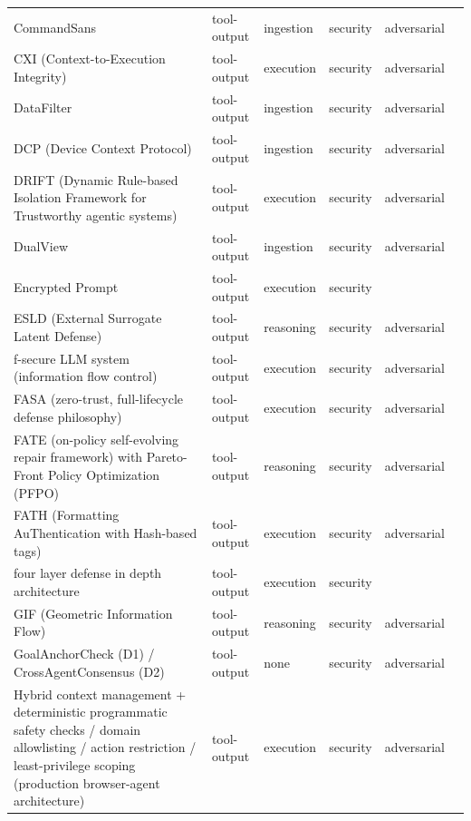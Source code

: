 \begin{longtable}{@{}>{\raggedright\arraybackslash}p{}lllll@{}}
CommandSans & tool-output & ingestion & security & adversarial & \cite{das-2025-commandsans} \\
CXI (Context-to-Execution Integrity) & tool-output & execution & security & adversarial & \cite{santosgrueiro-2026-contexttoexecution} \\
DataFilter & tool-output & ingestion & security & adversarial & \cite{wang-2025-defending} \\
DCP (Device Context Protocol) & tool-output & ingestion & security & adversarial & \cite{yang-2026-device} \\
DRIFT (Dynamic Rule-based Isolation Framework for Trustworthy agentic systems) & tool-output & execution & security & adversarial & \cite{li-2025-drift} \\
DualView & tool-output & ingestion & security & adversarial & \cite{kim-2026-dualview} \\
Encrypted Prompt & tool-output & execution & security &  & \cite{chan-2025-encrypted} \\
ESLD (External Surrogate Latent Defense) & tool-output & reasoning & security & adversarial & \cite{narendra-2026-esld} \\
f-secure LLM system (information flow control) & tool-output & execution & security & adversarial & \cite{wu-2024-systemlevel} \\
FASA (zero-trust, full-lifecycle defense philosophy) & tool-output & execution & security & adversarial & \cite{ying-2026-uncovering} \\
FATE (on-policy self-evolving repair framework) with Pareto-Front Policy Optimization (PFPO) & tool-output & reasoning & security & adversarial & \cite{yin-2026-onpolicy} \\
FATH (Formatting AuThentication with Hash-based tags) & tool-output & execution & security & adversarial & \cite{wang-2024-fath} \\
four layer defense in depth architecture & tool-output & execution & security &  & \cite{maiti-2026-caging} \\
GIF (Geometric Information Flow) & tool-output & reasoning & security & adversarial & \cite{storek-2026-gif} \\
GoalAnchorCheck (D1) / CrossAgentConsensus (D2) & tool-output & none & security & adversarial & \cite{wang-2026-planflip} \\
Hybrid context management + deterministic programmatic safety checks / domain allowlisting / action restriction / least-privilege scoping (production browser-agent architecture) & tool-output & execution & security & adversarial & \cite{vardanyan-2025-building} \\

\end{longtable}
